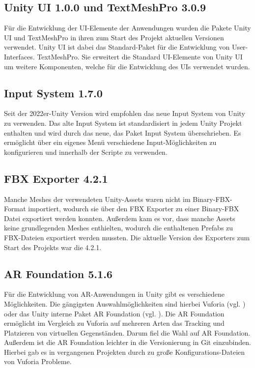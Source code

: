 \subsection{Unity UI 1.0.0 und TextMeshPro 3.0.9}
Für die Entwicklung der \ac{UI}-Elemente der Anwendungen wurden die Pakete Unity \ac{UI} und TextMeshPro in ihren zum Start des Projekt aktuellen Versionen verwendet. Unity \ac{UI} ist dabei das Standard-Paket für die Entwicklung von User-Interfaces. TextMeshPro. Sie erweitert die Standard \ac{UI}-Elemente von Unity \ac{UI} um weitere Komponenten, welche für die Entwicklung des \ac{UI}s verwendet wurden.

\subsection{Input System 1.7.0}
Seit der 2022er-Unity Version wird empfohlen das neue Input System von Unity zu verwenden. Das alte Input System ist standardisiert in jedem Unity Projekt enthalten und wird durch das neue, das Paket Input System überschrieben. Es ermöglicht über ein eigenes Menü verschiedene Input-Möglichkeiten zu konfigurieren und innerhalb der Scripte zu verwenden.

\subsection{FBX Exporter 4.2.1}
Manche Meshes der verwendeten Unity-Assets waren nicht im Binary-\ac{FBX}-Format importiert,  wodurch sie über den \ac{FBX} Exporter zu einer Binary-\ac{FBX} Datei exportiert werden konnten. Außerdem kam es vor, dass manche Assets keine grundlegenden Meshes enthielten, wodurch die enthaltenen Prefabs zu \ac{FBX}-Dateien exportiert werden mussten. Die aktuelle Version des Exporters zum Start des Projekts war die 4.2.1.

\subsection{AR Foundation 5.1.6}
Für die Entwicklung von \ac{AR}-Anwendungen in Unity gibt es verschiedene Möglichkeiten. Die gängigsten Auswahlmöglichkeiten sind hierbei Vuforia (vgl. \cite{noauthor_home_nodate}) oder das Unity interne Paket AR Foundation (vgl. \cite{noauthor_ar_nodate}). Die AR Foundation ermöglicht im Vergleich zu Vuforia auf mehreren Arten das Tracking und Platzieren von virtuellen Gegenständen. Darum fiel die Wahl auf AR Foundation. Außerdem ist die AR Foundation leichter in die Versionierung in Git einzubinden. Hierbei gab es in vergangenen Projekten durch zu große Konfigurations-Dateien von Vuforia Probleme.

